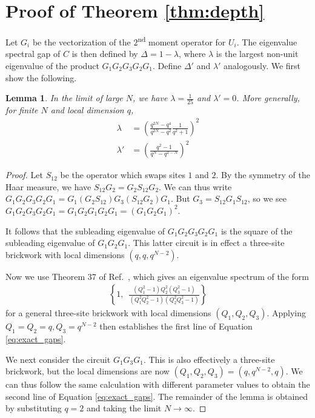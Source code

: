 \documentclass[aps,prx,floatfix,nofootinbib,superscriptaddress,longbibliography]{revtex4-2}
\newtheorem{lemma}{Lemma}
\begin{document}
\section{Proof of Theorem \ref{thm:depth}}
Let $G_i$ be the vectorization of the $2$\textsuperscript{nd} moment operator for $U_i$. The eigenvalue spectral gap of $C$ is then defined by $\Delta = 1 - \lambda$, where $\lambda$ is the largest non-unit eigenvalue of the product $G_1 G_2 G_3 G_2 G_1$. Define $\Delta'$ and $\lambda'$ analogously.
We first show the following.
\begin{lemma}
\label{lemma:exact_gaps}
In the limit of large $N$, we have $\lambda = \frac{1}{25}$ and $\lambda' = 0$. More generally, for finite $N$ and local dimension $q$,
\begin{align}
    \label{eq:exact_gaps}
    \lambda &= \left(\frac{q^{2N} - q^4}{q^{2N} - q^2}\frac{1}{q^{2} + 1}\right)^2 \\
    \lambda' &= \left(\frac{q^2 - 1}{q^{N} - q^{2-N}}\right)^{2}
\end{align}
\end{lemma}
\begin{proof}
    Let $S_{12}$ be the operator which swaps sites $1$ and $2$. By the symmetry of the Haar measure, we have $S_{12} G_2 = G_2 S_{12} G_2$. We can thus write $G_1 G_2 G_3 G_2 G_1 = G_1 (G_2 S_{12}) G_3 (S_{12} G_2) G_1$. But $G_3 = S_{12} G_1 S_{12}$, so we see $G_1 G_2 G_3 G_2 G_1 = G_1 G_2 G_1 G_2 G_1 = (G_1 G_2 G_1)^2$.

    It follows that the subleading eigenvalue of $G_1 G_2 G_3 G_2 G_1$ is the square of the subleading eigenvalue of $G_1 G_2 G_1$. This latter circuit is in effect a three-site brickwork with local dimensions $(q, q, q^{N-2})$.

    Now we use Theorem 37 of Ref.~, which gives an eigenvalue spectrum of the form
    \begin{gather}
        \left\{ 1, \,\,\,\frac{(Q_1^2-1)Q_2^2(Q_3^2-1)}{(Q_1^2Q_2^2-1)(Q_2^2Q_3^2-1)}\right\}
    \end{gather}
    for a general three-site brickwork with local dimensions $(Q_1, Q_2, Q_3)$. Applying $Q_1=Q_2=q, Q_3=q^{N-2}$ then establishes the first line of Equation \ref{eq:exact_gaps}. 

    We next consider the circuit $G_1 G_3 G_1$. This is also effectively a three-site brickwork, but the local dimensions are now $(Q_1, Q_2, Q_3)=(q, q^{N-2}, q)$. We can thus follow the same calculation with different parameter values to obtain the second line of Equation \ref{eq:exact_gaps}. The remainder of the lemma is obtained by substituting $q = 2$ and taking the limit $N \rightarrow \infty$.
\end{proof}
\end{document}
